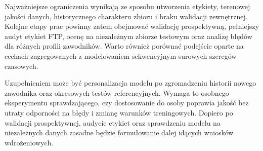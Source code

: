 Najważniejsze ograniczenia wynikają ze sposobu utworzenia etykiety, terenowej jakości danych, historycznego charakteru zbioru i braku walidacji zewnętrznej. Kolejne etapy prac powinny zatem obejmować walidację prospektywną, pełniejszy audyt etykiet FTP, ocenę na niezależnym zbiorze testowym oraz analizę błędów dla różnych profili zawodników. Warto również porównać podejście oparte na cechach zagregowanych z modelowaniem sekwencyjnym surowych szeregów czasowych.

Uzupełnieniem może być personalizacja modelu po zgromadzeniu historii nowego zawodnika oraz okresowych testów referencyjnych. Wymaga to osobnego eksperymentu sprawdzającego, czy dostosowanie do osoby poprawia jakość bez utraty odporności na błędy i zmianę warunków treningowych. Dopiero po walidacji prospektywnej, audycie etykiet oraz sprawdzeniu modelu na niezależnych danych zasadne będzie formułowanie dalej idących wniosków wdrożeniowych.
